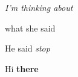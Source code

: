 \documentclass[11pt,a4paper]{article}
\begin{document}
\textit{I'm thinking about}

what she said

He said  \textit{stop}

Hi  \textbf{there}
\end{document}
